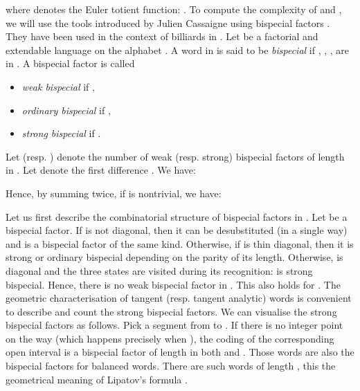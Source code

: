 \documentclass[preliminary]{eptcs}
\begin{document}
where  denotes the Euler totient function: .
\newline
\newline
To compute the complexity of  and , we will use the
tools introduced by Julien Cassaigne using bispecial factors
\cite{Cassaigne1997}. They have been used in the context of billiards in
\cite{CassaigneHubertTroubetzkoy2002}.
Let  be a factorial and extendable language on the alphabet .
A word  in  is said to be \emph{bispecial} if , , , 
are in . A bispecial factor  is called 
\begin{itemize}
\item \emph{weak bispecial} if , 
\item \emph{ordinary bispecial} if ,
\item \emph{strong bispecial} if . 
\end{itemize}
Let  (resp. ) denote the number of weak (resp. strong)
bispecial factors of length  in .
Let  denote the first difference . We have:

Hence, by summing twice, if  is nontrivial, we have:

\newline
Let us first describe the combinatorial structure of bispecial factors in
.
Let  be a bispecial factor.
If  is not diagonal, then it can be desubstituted (in a single way) and
 is a bispecial factor of the same kind.
Otherwise, if  is thin diagonal, then it is strong or ordinary
bispecial depending on the parity of its length. Otherwise,  is
diagonal and the three states are visited during its recognition:  is
strong bispecial.
Hence, there is no weak bispecial factor in .
This also holds for .
\newline
\newline
The geometric characterisation of tangent (resp. tangent analytic) words
is convenient to describe and count the strong bispecial factors.
We can visualise the strong bispecial factors as follows.
Pick a segment from   to .
\newline
If there is no integer point on the way (which happens precisely when
), the coding of the corresponding open interval is a
bispecial factor of length  in both  and .
Those words are also the bispecial factors for balanced words. There are
 such words of length , this the geometrical meaning of
Lipatov's formula \cite{Lipatov1982}.
\newline \newline
\end{document}
